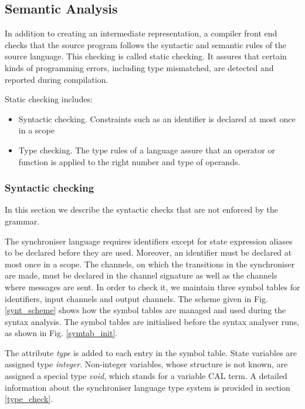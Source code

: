 


\subsection{Semantic Analysis}
In addition to creating an intermediate representation, a compiler front end checks that the source program follows the syntactic and semantic rules of the source language. This checking is called static checking. It assures that certain kinds of programming errors, including type mismatched, are detected and reported during compilation.

Static checking includes:
\begin{itemize}
\item Syntactic checking. Constraints such as an identifier is declared at most once in a scope
\item Type checking. The type rules of a language assure that an operator or function is applied to the right number and type of operands.
\end{itemize}

  \subsubsection{Syntactic checking}
In this section we describe the syntactic checks that are not enforced by the grammar.

The synchroniser language requires identifiers except for state expression aliases to be declared before they are used. Moreover, an identifier must be declared at most once in a scope. The channels, on which the transitions in the synchroniser are made, must be declared in the channel signature as well as the channels where messages are sent. In order to check it, we maintain three symbol tables for identifiers, input channels and output channels. The scheme given in Fig. \ref{synt_scheme} shows how the symbol tables are managed and used during the syntax analysis. The symbol tables are initialised before the syntax analyser runs, as shown in Fig. \ref{symtab_init}.

The attribute \emph{type} is added to each entry in the symbol table. State variables are assigned type \emph{integer}. Non-integer variables, whose structure is not known, are assigned a special type \emph{void}, which stands for a variable CAL term. A detailed information about the synchroniser language type system is provided in section \ref{type_check}.


